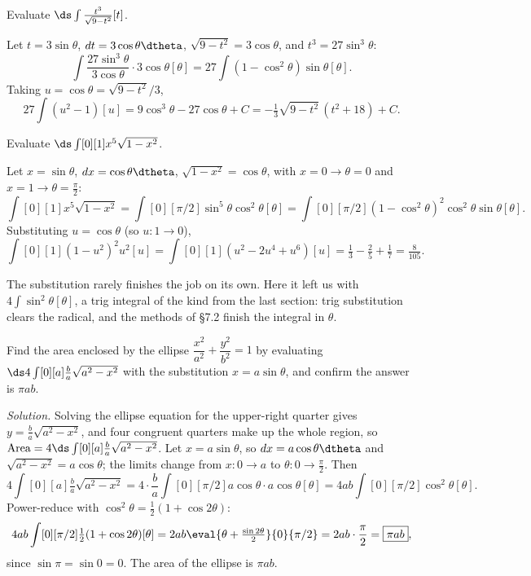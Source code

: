\begin{exercise}
	Evaluate $\ds \int{\frac{t^3}{\sqrt{9 - t^2}}}[t]$.
\end{exercise}
\begin{solution}[2.5in]
	Let $t = 3\sin\theta$, $dt = 3\cos\theta\dtheta$, $\sqrt{9 - t^2} = 3\cos\theta$,
	and $t^3 = 27\sin^3\theta$:
	\[
		\int{\frac{27\sin^3\theta}{3\cos\theta} \cdot 3\cos\theta}[\theta]
		   = 27\int{(1 - \cos^2\theta)\sin\theta}[\theta].
	\]
	Taking $u = \cos\theta = \sqrt{9 - t^2}/3$,
	\[
		27\int{(u^2 - 1)}[u]
		   = 9\cos^3\theta - 27\cos\theta + C
		   = \boxed{-\tfrac13\sqrt{9 - t^2}\,(t^2 + 18) + C}.
	\]
\end{solution}

\begin{exercise}
	Evaluate $\ds \int[0][1]{x^5\sqrt{1 - x^2}}$.
\end{exercise}
\begin{solution}[2.75in]
	Let $x = \sin\theta$, $dx = \cos\theta\dtheta$, $\sqrt{1 - x^2} = \cos\theta$,
	with $x = 0 \to \theta = 0$ and $x = 1 \to \theta = \tfrac{\pi}{2}$:
	\[
		\int[0][1]{x^5\sqrt{1 - x^2}}
		   = \int[0][\pi/2]{\sin^5\theta\cos^2\theta}[\theta]
		   = \int[0][\pi/2]{(1 - \cos^2\theta)^2\cos^2\theta\sin\theta}[\theta].
	\]
	Substituting $u = \cos\theta$ (so $u : 1 \to 0$),
	\[
		\int[0][1]{(1 - u^2)^2 u^2}[u]
		   = \int[0][1]{(u^2 - 2u^4 + u^6)}[u]
		   = \tfrac13 - \tfrac25 + \tfrac17
		   = \boxed{\tfrac{8}{105}}.
	\]
\end{solution}

\begin{remark}
	The substitution rarely finishes the job on its own. Here it left us with
	$4\int{\sin^2\theta}[\theta]$, a trig integral of the kind from the last
	section: trig substitution clears the radical, and the methods of \S 7.2
	finish the integral in $\theta$.
\end{remark}

\begin{challenge}
	Find the area enclosed by the ellipse $\dfrac{x^2}{a^2} + \dfrac{y^2}{b^2} = 1$
	by evaluating $\ds 4\int[0][a]{\frac{b}{a}\sqrt{a^2 - x^2}}$
	with the substitution $x = a\sin\theta$, and confirm the answer is
	$\pi a b$.
\end{challenge}
\ifsolutions
\smallskip\noindent\textit{Solution.}\quad
Solving the ellipse equation for the upper-right quarter gives
$y = \tfrac{b}{a}\sqrt{a^2 - x^2}$, and four congruent quarters make up the
whole region, so $\text{Area} = 4\ds\int[0][a]{\tfrac{b}{a}\sqrt{a^2 - x^2}}$.
Let $x = a\sin\theta$, so $dx = a\cos\theta\dtheta$ and
$\sqrt{a^2 - x^2} = a\cos\theta$; the limits change from $x: 0 \to a$ to
$\theta: 0 \to \tfrac{\pi}{2}$. Then
\[
	4\int[0][a]{\tfrac{b}{a}\sqrt{a^2 - x^2}}
	  = 4\cdot\frac{b}{a}\int[0][\pi/2]{a\cos\theta\cdot a\cos\theta}[\theta]
	  = 4ab\int[0][\pi/2]{\cos^2\theta}[\theta].
\]
Power-reduce with $\cos^2\theta = \tfrac12(1 + \cos 2\theta)$:
\[
	4ab\int[0][\pi/2]{\tfrac12(1 + \cos 2\theta)}[\theta]
	  = 2ab\eval{\theta + \tfrac{\sin 2\theta}{2}}{0}{\pi/2}
	  = 2ab\cdot\frac{\pi}{2}
	  = \boxed{\pi a b},
\]
since $\sin\pi = \sin 0 = 0$. The area of the ellipse is $\pi a b$.
\fi
